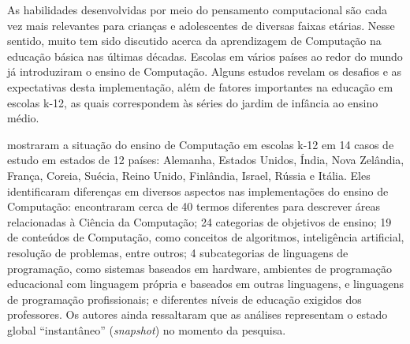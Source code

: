 As habilidades desenvolvidas por meio do pensamento computacional são cada vez mais relevantes para crianças e adolescentes de diversas faixas etárias. Nesse sentido, muito tem sido discutido acerca da aprendizagem de Computação na educação básica nas últimas décadas. Escolas em vários países ao redor do mundo já introduziram o ensino de Computação. Alguns estudos revelam os desafios e as expectativas desta implementação, além de fatores importantes na educação em escolas k-12, as quais correspondem às séries do jardim de infância ao ensino médio.

\citet{hubwieser2015global} mostraram a situação do ensino de Computação em escolas k-12 em 14 casos de estudo em estados de 12 países: Alemanha, Estados Unidos, Índia, Nova Zelândia, França, Coreia, Suécia, Reino Unido, Finlândia, Israel, Rússia e Itália. Eles identificaram diferenças em diversos aspectos nas implementações do ensino de Computação: encontraram cerca de 40 termos diferentes para descrever áreas relacionadas à Ciência da Computação; 24 categorias de objetivos de ensino; 19 de conteúdos de Computação, como conceitos de algoritmos, inteligência artificial, resolução de problemas, entre outros; 4 subcategorias de linguagens de programação, como sistemas baseados em hardware, ambientes de programação educacional com linguagem própria e baseados em outras linguagens, e linguagens de programação profissionais; e diferentes níveis de educação exigidos dos professores. Os autores ainda ressaltaram que as análises representam o estado global \enquote{instantâneo} (\textit{snapshot}) no momento da pesquisa.



